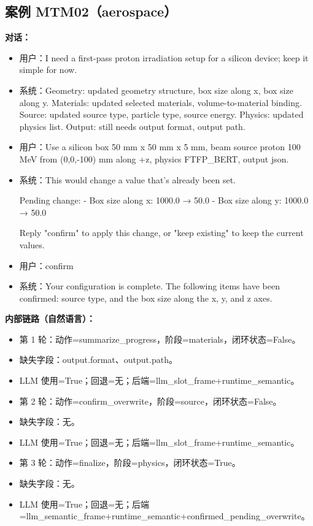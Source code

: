 \documentclass[11pt]{ctexart}
\begin{document}
\subsection{案例 MTM02（aerospace）}
\textbf{对话：}
\begin{itemize}
\item 用户：I need a first-pass proton irradiation setup for a silicon device; keep it simple for now.
\item 系统：Geometry: updated geometry structure, box size along x, box size along y. Materials: updated selected materials, volume-to-material binding. Source: updated source type, particle type, source energy. Physics: updated physics list. Output: still needs output format, output path.
\item 用户：Use a silicon box 50 mm x 50 mm x 5 mm, beam source proton 100 MeV from (0,0,-100) mm along +z, physics FTFP\_BERT, output json.
\item 系统：This would change a value that's already been set.

Pending change:
- Box size along x: 1000.0 → 50.0
- Box size along y: 1000.0 → 50.0

Reply "confirm" to apply this change, or "keep existing" to keep the current values.
\item 用户：confirm
\item 系统：Your configuration is complete. The following items have been confirmed: source type, and the box size along the x, y, and z axes.
\end{itemize}
\textbf{内部链路（自然语言）：}
\begin{itemize}
\item 第 1 轮：动作=summarize\_progress，阶段=materials，闭环状态=False。
\item 缺失字段：output.format、output.path。
\item LLM 使用=True；回退=无；后端=llm\_slot\_frame+runtime\_semantic。
\item 第 2 轮：动作=confirm\_overwrite，阶段=source，闭环状态=False。
\item 缺失字段：无。
\item LLM 使用=True；回退=无；后端=llm\_slot\_frame+runtime\_semantic。
\item 第 3 轮：动作=finalize，阶段=physics，闭环状态=True。
\item 缺失字段：无。
\item LLM 使用=True；回退=无；后端=llm\_semantic\_frame+runtime\_semantic+confirmed\_pending\_overwrite。
\end{itemize}
\end{document}
